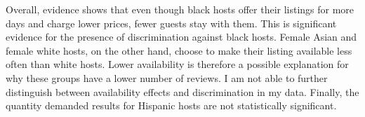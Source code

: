 Overall, evidence shows that even though black hosts offer their listings for more days and charge lower prices, fewer guests stay with them. This is significant evidence for the presence of discrimination against black hosts. Female Asian and female white hosts, on the other hand, choose to make their listing available less often than white hosts. Lower availability is therefore a possible explanation for why these groups have a lower number of reviews. I am not able to further distinguish between availability effects and discrimination in my data. Finally, the quantity demanded results for Hispanic hosts are not statistically significant. 















